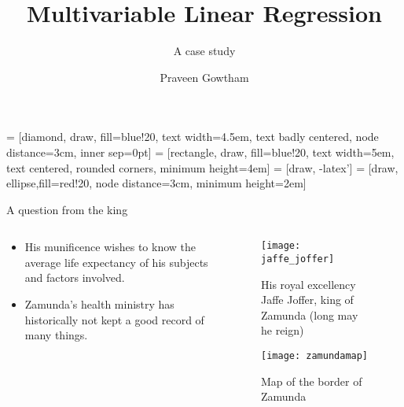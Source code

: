 \documentclass{beamer}
\title[Flatiron Lesson 1]{Multivariable Linear Regression}
\subtitle{A case study}
\author{Praveen Gowtham} %
\date{} %
\begin{document}
 = [diamond, draw, fill=blue!20, 
text width=4.5em, text badly centered, node distance=3cm, inner sep=0pt]
 = [rectangle, draw, fill=blue!20, 
text width=5em, text centered, rounded corners, minimum height=4em]
 = [draw, -latex']
 = [draw, ellipse,fill=red!20, node distance=3cm,
minimum height=2em]
	
	\begin{frame}
		\titlepage %
	\end{frame}
\begin{frame}{A question from the king}
		\begin{columns}
		\begin{column}{0.5\textwidth}
			\begin{itemize}
				\item His munificence wishes to know the average life expectancy of his subjects and factors involved.
				\item Zamunda's health ministry has historically not kept a good record of many things.
			\end{itemize}

		\end{column}	
		\begin{column}{0.5\textwidth}
			\begin{figure}
				\texttt{[image: jaffe\_joffer]}
				\caption{His royal excellency Jaffe Joffer, king of Zamunda (long may he reign)}
			\end{figure}
			\begin{figure}
			\texttt{[image: zamundamap]}
			\caption{Map of the border of Zamunda}
		\end{figure}
		\end{column}
		
	\end{columns}	

\end{frame}
\end{document}
